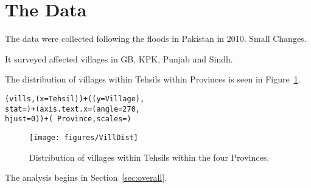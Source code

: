 \documentclass{article}
\title{\myTitle}
\author{Richard Garfield\\ Columbia University School of Nursing \and Jared P. Lander\\ JP Lander Consulting}
\begin{document}






\section{The Data}
\label{sec:thedata}


The data were collected following the floods in Pakistan in 2010. Small Changes.

It surveyed affected villages in GB, KPK, Punjab and Sindh.


The distribution of villages within Tehsils within Provinces is seen in Figure~\ref{fig:VillDist}.

\begin{knitrout}
\color{fgcolor}\begin{kframe}
\begin{alltt}
(vills, (x = Tehsil)) + ((y = Village), 
    stat = ) + (axis.text.x = (angle = 270, 
    hjust = 0)) + (~Province, scales = )
\end{alltt}
\end{kframe}\begin{figure}[!hbtp]


{\centering \texttt{[image: figures/VillDist]} 

}

\caption[Distribution of villages within Tehsils]{Distribution of villages within Tehsils within the four Provinces.\label{fig:VillDist}}
\end{figure}


\end{knitrout}

The analysis begins in Section~\ref{sec:overall}.
\end{document}
